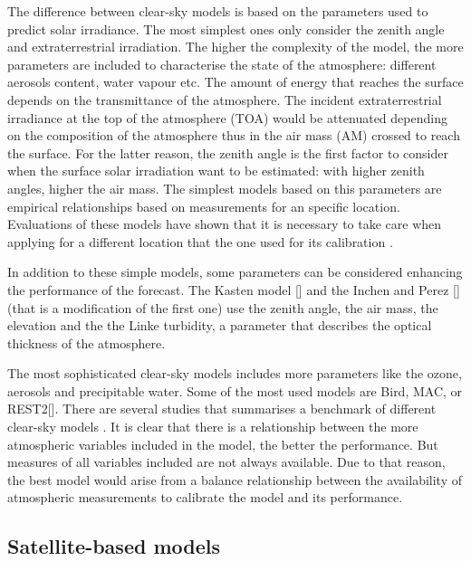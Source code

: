 The difference between clear-sky models is based on the parameters used to predict solar irradiance. The most simplest ones only consider the zenith angle and extraterrestrial irradiation. The higher the complexity of the model, the more parameters are included to characterise the state of the atmosphere: different aerosols content, water vapour etc. 
The amount of energy that reaches the surface depends on the transmittance of the atmosphere. The incident extraterrestrial irradiance at the top of the atmosphere (TOA) would be attenuated depending on the composition of the atmosphere thus in the air mass (AM) crossed to reach the surface. For the latter reason, the zenith angle is the first factor to consider when the surface solar irradiation want to be estimated: with higher zenith angles, higher the air mass. The simplest models based on this parameters are empirical relationships based on measurements for an specific location. Evaluations of these models have shown that it is necessary to take care when applying for a different location that the one used for its calibration \cite*{Badescu1997, Davies1989}.

In addition to these simple models, some parameters can be considered enhancing the performance of the forecast. The Kasten model [] and the Inchen and Perez [] (that is a modification of the first one) use the zenith angle, the air mass, the elevation and the the Linke turbidity, a parameter that describes the optical thickness of the atmosphere.

The most sophisticated clear-sky models includes more parameters like the ozone, aerosols and precipitable water. Some of the most used models are Bird, MAC, or REST2[]. There are several studies that summarises a benchmark of different clear-sky models \cite*{Gueymard2013a,b}. It is clear that there is a relationship between the more atmospheric variables included in the model, the better the performance. But measures of all variables included are not always available. Due to that reason, the best model would arise from a balance relationship between the availability of atmospheric measurements to calibrate the model and its performance. 
 

\subsection{Satellite-based models}

